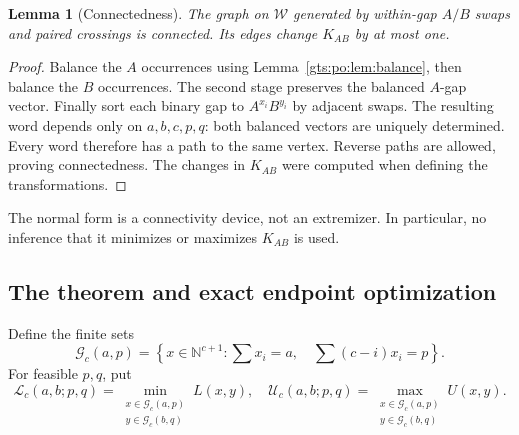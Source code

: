 \documentclass[11pt,letterpaper]{article}
\newtheorem{lemma}[theorem]{Lemma}
\theoremstyle{definition}
\theoremstyle{remark}
\newcommand{\N}{\mathbb N}
\newcommand{\gap}{\mathcal G}
\newcommand{\low}{\mathcal L}
\newcommand{\up}{\mathcal U}
\begin{document}
\begin{lemma}[Connectedness]\label{gts:po:lem:connected}
The graph on $\mathcal W$ generated by within-gap $A/B$ swaps and paired crossings is connected. Its edges change $K_{AB}$ by at most one.
\end{lemma}
\begin{proof}
Balance the $A$ occurrences using Lemma~\ref{gts:po:lem:balance}, then balance the $B$ occurrences. The second stage preserves the balanced $A$-gap vector. Finally sort each binary gap to $A^{x_i}B^{y_i}$ by adjacent swaps. The resulting word depends only on $a,b,c,p,q$: both balanced vectors are uniquely determined. Every word therefore has a path to the same vertex. Reverse paths are allowed, proving connectedness. The changes in $K_{AB}$ were computed when defining the transformations.
\end{proof}
The normal form is a connectivity device, not an extremizer. In particular, no inference that it minimizes or maximizes $K_{AB}$ is used.

\subsection{The theorem and exact endpoint optimization}
Define the finite sets
\[
 \gap_c(a,p)=\left\{x\in\N^{c+1}:\sum x_i=a,\quad
                  \sum(c-i)x_i=p\right\}.
\]
For feasible $p,q$, put
\begin{equation}\label{gts:po:eq:generalendpoints}
 \low_c(a,b;p,q)=\min_{\substack{x\in\gap_c(a,p)\\y\in\gap_c(b,q)}}L(x,y),
 \quad
 \up_c(a,b;p,q)=\max_{\substack{x\in\gap_c(a,p)\\y\in\gap_c(b,q)}}U(x,y).
\end{equation}
\end{document}
